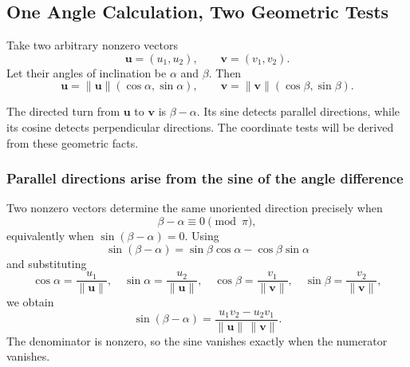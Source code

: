 \subsection{One Angle Calculation, Two Geometric Tests}

Take two arbitrary nonzero vectors
\[
\mathbf u=(u_1,u_2),
\qquad
\mathbf v=(v_1,v_2).
\]
Let their angles of inclination be $\alpha$ and $\beta$. Then
\[
\mathbf u=\|\mathbf u\|(\cos\alpha,\sin\alpha),
\qquad
\mathbf v=\|\mathbf v\|(\cos\beta,\sin\beta).
\]

\begin{corebox}
The directed turn from $\mathbf u$ to $\mathbf v$ is $\beta-\alpha$. Its sine
detects parallel directions, while its cosine detects perpendicular directions.
The coordinate tests will be derived from these geometric facts.
\end{corebox}

\begin{center}
\end{center}

\subsubsection{Parallel directions arise from the sine of the angle difference}

\begin{derivationbox}
Two nonzero vectors determine the same unoriented direction precisely when
\[
\beta-\alpha\equiv0\pmod{\pi},
\]
equivalently when $\sin(\beta-\alpha)=0$. Using
\[
\sin(\beta-\alpha)=\sin\beta\cos\alpha-\cos\beta\sin\alpha
\]
and substituting
\[
\cos\alpha=\frac{u_1}{\|\mathbf u\|},
\quad
\sin\alpha=\frac{u_2}{\|\mathbf u\|},
\quad
\cos\beta=\frac{v_1}{\|\mathbf v\|},
\quad
\sin\beta=\frac{v_2}{\|\mathbf v\|},
\]
we obtain
\[
\sin(\beta-\alpha)
=
\frac{u_1v_2-u_2v_1}{\|\mathbf u\|\,\|\mathbf v\|}.
\]
The denominator is nonzero, so the sine vanishes exactly when the numerator
vanishes.
\end{derivationbox}


